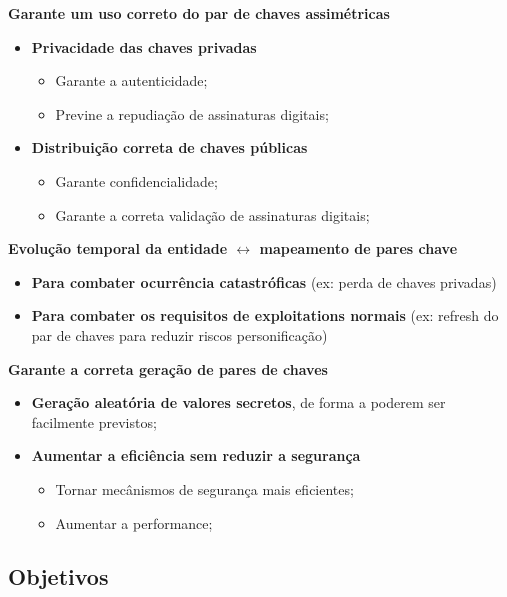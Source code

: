 \documentclass{article}
\begin{document}
\begin{flushleft}
  \textbf{Garante um uso correto do par de chaves assimétricas}

  \begin{itemize}
     
  

    \item \textbf{Privacidade das chaves privadas}
    \begin{itemize}
      \item Garante a autenticidade;
      \item Previne a repudiação de assinaturas digitais;
    \end{itemize}

    \item \textbf{Distribuição correta de chaves públicas}
    \begin{itemize}
      \item Garante confidencialidade;
      \item Garante a correta validação de assinaturas digitais;
    \end{itemize}

  \end{itemize}

  \vspace{2mm}

  \textbf{Evolução temporal da entidade $\longleftrightarrow$ mapeamento de pares chave}

  \begin{itemize}
  
    \item \textbf{Para combater ocurrência catastróficas} (ex: perda de chaves privadas)

    \item \textbf{Para combater os requisitos de exploitations normais}
    (ex: refresh do par de chaves para reduzir riscos personificação)

  \end{itemize}

  \vspace{2mm}

  \textbf{Garante a correta geração de pares de chaves}
  \begin{itemize}
    \item \textbf{Geração aleatória de valores secretos}, de forma a poderem ser facilmente previstos;
    \item \textbf{Aumentar a eficiência sem reduzir a segurança}
    \begin{itemize}
      \item Tornar mecânismos de segurança mais eficientes;
      \item Aumentar a performance;
    \end{itemize}
  \end{itemize}
\end{flushleft}

\subsection{Objetivos}
\end{document}
